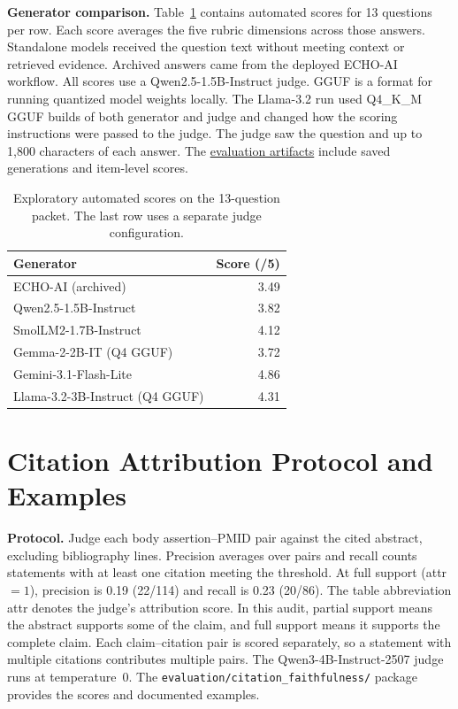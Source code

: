 \documentclass[11pt]{article}
\begin{document}
\textbf{Generator comparison.} Table~\ref{tab:generators} contains automated scores for 13 questions per row. Each score averages the five rubric dimensions across those answers. Standalone models received the question text without meeting context or retrieved evidence. Archived answers came from the deployed ECHO-AI workflow. All scores use a Qwen2.5-1.5B-Instruct judge. GGUF is a format for running quantized model weights locally. The Llama-3.2 run used Q4\_K\_M GGUF builds of both generator and judge and changed how the scoring instructions were passed to the judge. The judge saw the question and up to 1,800 characters of each answer. The \href{https://github.com/238Plutonium/openreview/tree/85f3e5969a01605c961e7bc2deb1be49f99965f9/evaluation/frontier_baselines}{evaluation artifacts} include saved generations and item-level scores.

\begin{table}[!ht]\centering\small\setlength{\tabcolsep}{4pt}
\begin{tabularx}{\columnwidth}{@{}Xr@{}}\toprule
\textbf{Generator} & \textbf{Score (/5)}\\\midrule
ECHO-AI (archived) & 3.49\\
Qwen2.5-1.5B-Instruct & 3.82\\
SmolLM2-1.7B-Instruct & 4.12\\
Gemma-2-2B-IT (Q4 GGUF) & 3.72\\
Gemini-3.1-Flash-Lite & 4.86\\
Llama-3.2-3B-Instruct (Q4 GGUF) & 4.31\\
\bottomrule\end{tabularx}
\caption{Exploratory automated scores on the 13-question packet. The last row uses a separate judge configuration.}\label{tab:generators}
\end{table}

\section{Citation Attribution Protocol and Examples}

\textbf{Protocol.} Judge each body assertion--PMID pair against the cited abstract, excluding bibliography lines. Precision averages over pairs and recall counts statements with at least one citation meeting the threshold. At full support (attr$=1$), precision is 0.19 (22/114) and recall is 0.23 (20/86). The table abbreviation attr denotes the judge's attribution score. In this audit, partial support means the abstract supports some of the claim, and full support means it supports the complete claim. Each claim--citation pair is scored separately, so a statement with multiple citations contributes multiple pairs. The Qwen3-4B-Instruct-2507 judge runs at temperature~0. The \nolinkurl{evaluation/citation_faithfulness/} package provides the scores and documented examples.
\end{document}
